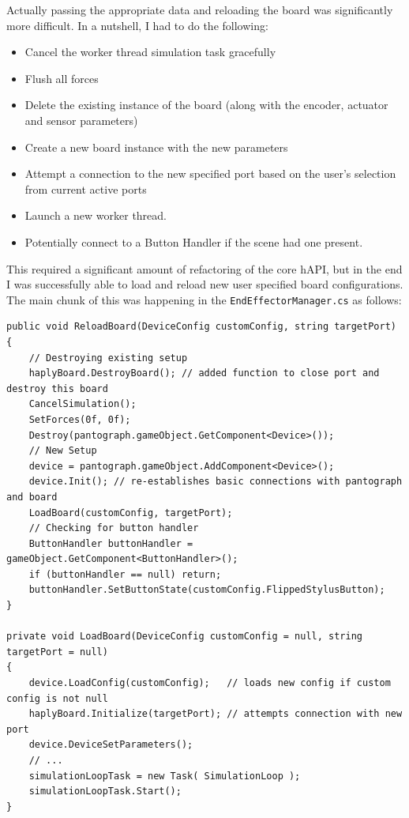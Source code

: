 Actually passing the appropriate data and reloading the board was significantly more difficult. In a nutshell, I had to do the following:
\begin{itemize}
    \item Cancel the worker thread simulation task gracefully
    \item Flush all forces
    \item Delete the existing instance of the board (along with the encoder, actuator and sensor parameters)
    \item Create a new board instance with the new parameters
    \item Attempt a connection to the new specified port based on the user’s selection from current active ports
    \item Launch a new worker thread.
    \item Potentially connect to a Button Handler if the scene had one present.
\end{itemize}

This required a significant amount of refactoring of the core hAPI, but in the end I was successfully able to load and reload new user specified board configurations. The main chunk of this was happening in the \texttt{EndEffectorManager.cs} as follows:

\begin{verbatim}
public void ReloadBoard(DeviceConfig customConfig, string targetPort)
{
    // Destroying existing setup
    haplyBoard.DestroyBoard(); // added function to close port and destroy this board
    CancelSimulation();
    SetForces(0f, 0f);
    Destroy(pantograph.gameObject.GetComponent<Device>());
    // New Setup
    device = pantograph.gameObject.AddComponent<Device>();
    device.Init(); // re-establishes basic connections with pantograph and board
    LoadBoard(customConfig, targetPort);
    // Checking for button handler
    ButtonHandler buttonHandler = gameObject.GetComponent<ButtonHandler>();
    if (buttonHandler == null) return;
    buttonHandler.SetButtonState(customConfig.FlippedStylusButton);
}

private void LoadBoard(DeviceConfig customConfig = null, string targetPort = null)
{
    device.LoadConfig(customConfig);   // loads new config if custom config is not null
    haplyBoard.Initialize(targetPort); // attempts connection with new port
    device.DeviceSetParameters();
    // ...
    simulationLoopTask = new Task( SimulationLoop );
    simulationLoopTask.Start();
}
\end{verbatim}

